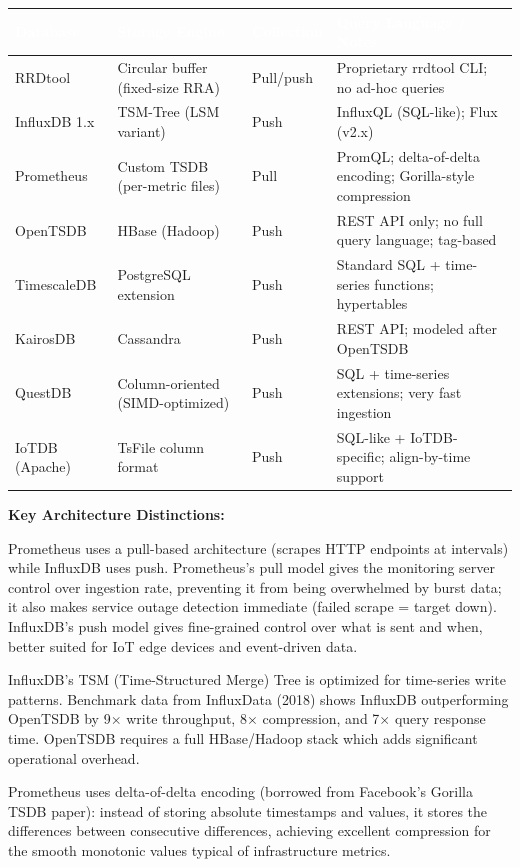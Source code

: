 \documentclass[11pt,letterpaper]{article}
\newcommand{\tableheader}[1]{\textbf{\sffamily\textcolor{white}{#1}}}
\begin{document}
\begin{center}
\begin{tabularx}{\textwidth}{L{2.5cm}L{2.5cm}L{2cm}X}
\toprule
{}
\tableheader{Database} & \tableheader{Storage Engine} & \tableheader{Collection} & \tableheader{Query Language / Notes} \\
\midrule
RRDtool & Circular buffer (fixed-size RRA) & Pull/push & Proprietary rrdtool CLI; no ad-hoc queries \\
InfluxDB 1.x & TSM-Tree (LSM variant) & Push & InfluxQL (SQL-like); Flux (v2.x) \\
Prometheus & Custom TSDB (per-metric files) & Pull & PromQL; delta-of-delta encoding; Gorilla-style compression \\
OpenTSDB & HBase (Hadoop) & Push & REST API only; no full query language; tag-based \\
TimescaleDB & PostgreSQL extension & Push & Standard SQL + time-series functions; hypertables \\
KairosDB & Cassandra & Push & REST API; modeled after OpenTSDB \\
QuestDB & Column-oriented (SIMD-optimized) & Push & SQL + time-series extensions; very fast ingestion \\
IoTDB (Apache) & TsFile column format & Push & SQL-like + IoTDB-specific; align-by-time support \\
\bottomrule
\end{tabularx}
\end{center}

\textbf{Key Architecture Distinctions:}

Prometheus uses a pull-based architecture (scrapes HTTP endpoints at intervals) while InfluxDB uses push. Prometheus's pull model gives the monitoring server control over ingestion rate, preventing it from being overwhelmed by burst data; it also makes service outage detection immediate (failed scrape = target down). InfluxDB's push model gives fine-grained control over what is sent and when, better suited for IoT edge devices and event-driven data.

InfluxDB's TSM (Time-Structured Merge) Tree is optimized for time-series write patterns. Benchmark data from InfluxData (2018) shows InfluxDB outperforming OpenTSDB by 9$\times$ write throughput, 8$\times$ compression, and 7$\times$ query response time. OpenTSDB requires a full HBase/Hadoop stack which adds significant operational overhead.

Prometheus uses delta-of-delta encoding (borrowed from Facebook's Gorilla TSDB paper): instead of storing absolute timestamps and values, it stores the differences between consecutive differences, achieving excellent compression for the smooth monotonic values typical of infrastructure metrics.
\end{document}
